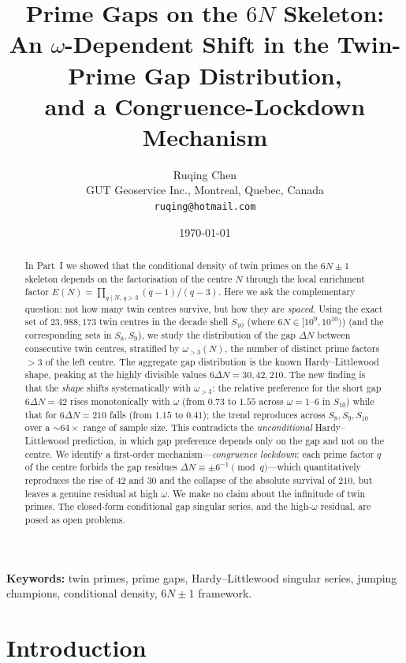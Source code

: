 \documentclass[11pt]{article}
\title{Prime Gaps on the $6N$ Skeleton:\\
An $\omega$-Dependent Shift in the Twin-Prime Gap Distribution,\\
and a Congruence-Lockdown Mechanism}
\author{Ruqing Chen\\
\small GUT Geoservice Inc., Montreal, Quebec, Canada\\
\small \texttt{ruqing@hotmail.com}}
\date{\today}
\theoremstyle{remark}\newtheorem{remark}{Remark}
\begin{document}
\maketitle

\begin{abstract}
In Part~I we showed that the conditional density of twin primes on the
$6N\pm1$ skeleton depends on the factorisation of the centre $N$ through the
local enrichment factor $E(N)=\prod_{q\mid N,\,q>3}(q-1)/(q-3)$. Here we ask the
complementary question: not how many twin centres survive, but how they are
\emph{spaced}. Using the exact set of $23{,}988{,}173$ twin centres in the decade
shell $S_{10}$ (where $6N\in[10^{9},10^{10})$) (and the corresponding sets in
$S_8,S_9$), we study the
distribution of the gap $\Delta N$ between consecutive twin centres, stratified
by $\omega_{>3}(N)$, the number of distinct prime factors $>3$ of the left
centre. The aggregate gap distribution is the known Hardy--Littlewood shape,
peaking at the highly divisible values $6\Delta N=30,42,210$. The new finding is
that the \emph{shape} shifts systematically with $\omega_{>3}$: the relative
preference for the short gap $6\Delta N=42$ rises monotonically with $\omega$
(from $0.73$ to $1.55$ across $\omega=1$--$6$ in $S_{10}$) while that for
$6\Delta N=210$ falls (from $1.15$ to $0.41$); the trend reproduces across
$S_8,S_9,S_{10}$ over a $\sim\!64\times$ range of sample size. This contradicts
the \emph{unconditional} Hardy--Littlewood prediction, in which gap preference
depends only on the gap and not on the centre. We identify a first-order
mechanism---\emph{congruence lockdown}: each prime factor $q$ of the centre
forbids the gap residues $\Delta N\equiv\pm6^{-1}\pmod q$---which quantitatively
reproduces the rise of $42$ and $30$ and the collapse of the absolute survival
of $210$, but leaves a genuine residual at high $\omega$. We make no claim about
the infinitude of twin primes. The closed-form conditional gap singular series,
and the high-$\omega$ residual, are posed as open problems.
\end{abstract}

\noindent\textbf{Keywords:} twin primes, prime gaps, Hardy--Littlewood singular
series, jumping champions, conditional density, $6N\pm1$ framework.

\section{Introduction}
\end{document}
